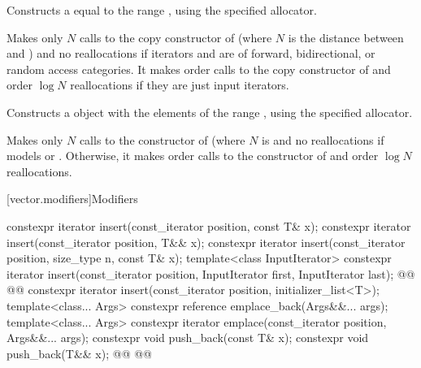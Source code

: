 \documentclass{wg21}
\begin{document}
\begin{itemdescr}

    \pnum
    \effects
    Constructs a  equal to the
    range , using the specified allocator.

    \pnum
    \complexity
    Makes only $N$
    calls to the copy constructor of
    (where $N$
    is the distance between
    and
    )
    and no reallocations if iterators  and  are of forward, bidirectional, or random access categories.
    It makes order
    calls to the copy constructor of
    and order
    $\log N$
    reallocations if they are just input iterators.
\end{itemdescr}

\begin{addedblock}
\begin{itemdecl}
template<@@ R>}
vector(from_range_t, R&& range, const Allocator& = Allocator());
\end{itemdecl}

\begin{itemdescr}
    \pnum
    \effects
    Constructs a  object with the elements of the range , using the specified allocator.

    \pnum
   \complexity
   Makes only $N$ calls to the constructor of  (where $N$ is 
   and no reallocations if  models  or .
   Otherwise, it makes order  calls to the constructor of  and order $\log N$ reallocations.
\end{itemdescr}
\end{addedblock}

[vector.modifiers]{Modifiers}

%
\begin{itemdecl}
    constexpr iterator insert(const_iterator position, const T& x);
    constexpr iterator insert(const_iterator position, T&& x);
    constexpr iterator insert(const_iterator position, size_type n, const T& x);
    template<class InputIterator>
    constexpr iterator insert(const_iterator position, InputIterator first, InputIterator last);
    @@
    @@
    constexpr iterator insert(const_iterator position, initializer_list<T>);
    template<class... Args> constexpr reference emplace_back(Args&&... args);
    template<class... Args> constexpr iterator emplace(const_iterator position, Args&&... args);
    constexpr void push_back(const T& x);
    constexpr void push_back(T&& x);
    @@
    @@
\end{itemdecl}
\end{document}
